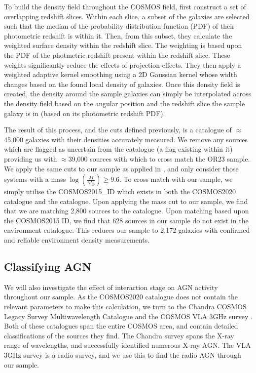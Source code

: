 To build the density field throughout the COSMOS field, \citet{2017ApJ...837...16D} first construct a set of overlapping redshift slices. Within each slice, a subset of the galaxies are selected such that the median of the probability distribution function (PDF) of their photometric redshift is within it. Then, from this subset, they calculate the weighted surface density within the redshift slice. The weighting is based upon the PDF of the photmetric redshift present within the redshift slice. These weights significantly reduce the effects of projection effects. They then apply a weighted adaptive kernel smoothing using a 2D Gaussian kernel whose width changes based on the found local density of galaxies. Once this density field is created, the density around the sample galaxies can simply be interpolated across the density field based on the angular position and the redshift slice the sample galaxy is in (based on its photometric redshift PDF).

The result of this process, and the cuts defined previously, is a catalogue of $\approx$45,000 galaxies with their densities accurately measured. We remove any sources which are flagged as uncertain from the catalogue (a flag existing within it) providing us with $\approx$39,000 sources with which to cross match the OR23 sample. We apply the same cuts to our sample as applied in \citet{2017ApJ...837...16D}, and only consider those systems with a mass $\log(\frac{M}{M_\odot}) \geq 9.6$. To cross match with our sample, we simply utilise the COSMOS2015\_ID which exists in both the COSMOS2020 catalogue and the \citet{2017ApJ...837...16D} catalogue. Upon applying the mass cut to our sample, we find that we are matching 2,800 sources to the \citet{2017ApJ...837...16D} catalogue. Upon matching based upon the COSMOS2015 ID, we find that 628 sources in our sample do not exist in the environment catalogue. This reduces our sample to 2,172 galaxies with confirmed and reliable environment density measurements.

\subsection{Classifying AGN}\label{sec:agn-clsf}
\noindent We will also investigate the effect of interaction stage on AGN activity throughout our sample. As the COSMOS2020 catalogue does not contain the relevant parameters to make this calculation, we turn to the Chandra COSMOS Legacy Survey Multiwavelength Catalogue \citep{2016ApJ...817...34M} and the COSMOS VLA 3GHz survey \citep{2017A&A...602A...6S, 2017A&A...602A...3D}. Both of these catalogues span the entire COSMOS area, and contain detailed classifications of the sources they find. The Chandra survey spans the X-ray range of wavelengths, and successfully identified numerous X-ray AGN. The VLA 3GHz survey is a radio survey, and we use this to find the radio AGN through our sample. 

